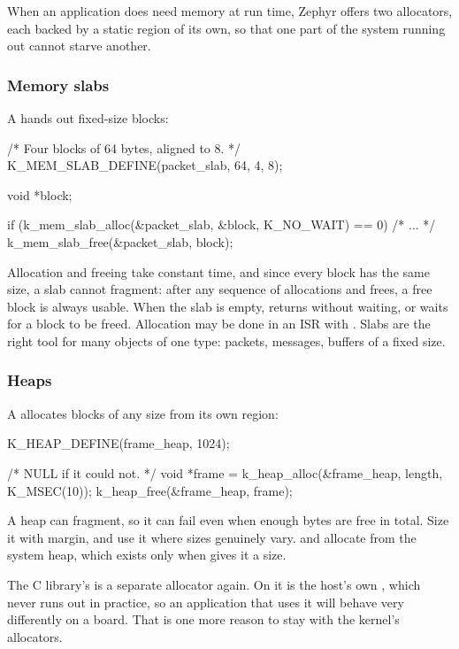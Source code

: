 \noindent When an application does need memory at run time, Zephyr offers two allocators, each
backed by a static region of its own, so that one part of the system running out cannot starve
another.

\subsubsection{Memory slabs}
A  hands out fixed-size blocks:

\begin{ccode}
/* Four blocks of 64 bytes, aligned to 8. */
K_MEM_SLAB_DEFINE(packet_slab, 64, 4, 8);

void *block;

if (k_mem_slab_alloc(&packet_slab, &block, K_NO_WAIT) == 0) {
	/* ... */
	k_mem_slab_free(&packet_slab, block);
}
\end{ccode}

\noindent Allocation and freeing take constant time, and since every block has the same size, a slab
cannot fragment: after any sequence of allocations and frees, a free block is always usable. When
the slab is empty,  returns  without waiting, or waits for a
block to be freed. Allocation may be done in an ISR with . Slabs are the right tool
for many objects of one type: packets, messages, buffers of a fixed size.

\subsubsection{Heaps}
A  allocates blocks of any size from its own region:

\begin{ccode}
K_HEAP_DEFINE(frame_heap, 1024);

/* NULL if it could not. */
void *frame = k_heap_alloc(&frame_heap, length, K_MSEC(10));
k_heap_free(&frame_heap, frame);
\end{ccode}

\noindent A heap can fragment, so it can fail even when enough bytes are free in total. Size it with
margin, and use it where sizes genuinely vary.  and  allocate from
the system heap, which exists only when  gives it a size.

The C library’s  is a separate allocator again. On  it is the host’s
own , which never runs out in practice, so an application that uses it will behave
very differently on a board. That is one more reason to stay with the kernel’s allocators.

